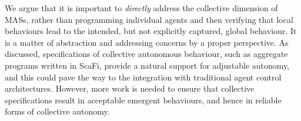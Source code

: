 We argue that it is important 
 to \emph{directly} address the collective dimension of MASs,
 rather than programming individual agents
 and then verifying that local behaviours lead to the intended, but not explicitly captured, global behaviour.
%
It is a matter of abstraction
 and addressing concerns by a proper perspective.
%
As discussed,
 specifications of collective autonomous behaviour,
 such as aggregate programs written in ScaFi,
 provide a natural support for adjustable autonomy,
 and this could pave the way to the integration
 with traditional agent control architectures.
%
However, more work is needed
 to ensure that collective specifications 
 result in acceptable emergent behaviours,
 and hence in reliable forms of collective autonomy.

\printbibliography